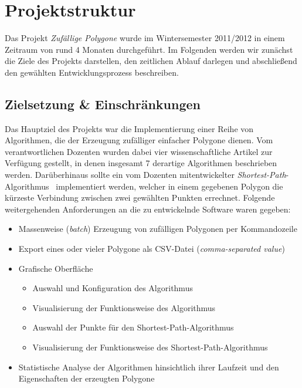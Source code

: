 \section{Projektstruktur}

  Das Projekt \emph{Zufällige Polygone} wurde im Wintersemester 2011/2012 in
  einem Zeitraum von rund 4 Monaten durchgeführt. Im Folgenden werden wir
  zunächst die Ziele des Projekts darstellen, den zeitlichen Ablauf darlegen
  und abschließend den gewählten Entwicklungsprozess beschreiben.

  \subsection{Zielsetzung \& Einschränkungen}

    Das Hauptziel des Projekts war die Implementierung einer Reihe von
    Algorithmen, die der Erzeugung zufälliger einfacher Polygone dienen. Vom
    verantwortlichen Dozenten wurden dabei vier wissenschaftliche Artikel zur
    Verfügung gestellt, in denen insgesamt 7 derartige Algorithmen beschrieben
    werden. Darüberhinaus sollte ein vom Dozenten mitentwickelter \emph
    {Shortest-Path}-Algorithmus~\cite{asano11shortestpath} implementiert werden,
    welcher in einem gegebenen Polygon die kürzeste Verbindung zwischen zwei
    gewählten Punkten errechnet. Folgende weitergehenden Anforderungen an die zu
    entwickelnde Software waren gegeben:

    \begin{itemize}
      \item Massenweise (\emph{batch}) Erzeugung von zufälligen Polygonen 
            per Kommandozeile
      \item Export eines oder vieler Polygone als CSV-Datei 
            (\emph{comma-separated value})
      \item Grafische Oberfläche
      \begin{itemize}
        \item Auswahl und Konfiguration des Algorithmus
        \item Visualisierung der Funktionsweise des Algorithmus
        \item Auswahl der Punkte für den Shortest-Path-Algorithmus
        \item Visualisierung der Funktionsweise des Shortest-Path-Algorithmus
      \end{itemize}
      \item Statistische Analyse der Algorithmen hinsichtlich ihrer Laufzeit 
            und den Eigenschaften der erzeugten Polygone
    \end{itemize}

